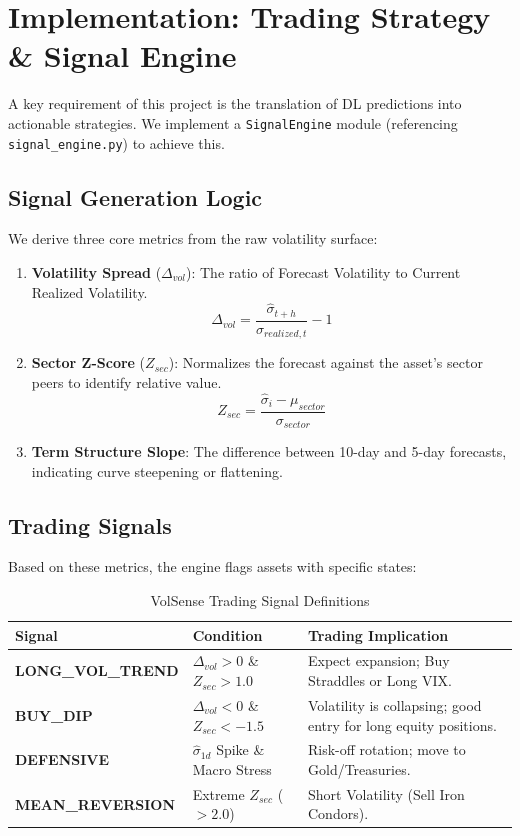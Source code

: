 \documentclass[11pt, a4paper]{article}
\begin{document}
\section{Implementation: Trading Strategy \& Signal Engine}
A key requirement of this project is the translation of DL predictions into actionable strategies. We implement a \texttt{SignalEngine} module (referencing \texttt{signal\_engine.py}) to achieve this.

\subsection{Signal Generation Logic}
We derive three core metrics from the raw volatility surface:
\begin{enumerate}
    \item \textbf{Volatility Spread} ($\Delta_{vol}$): The ratio of Forecast Volatility to Current Realized Volatility.
    \[ \Delta_{vol} = \frac{\hat{\sigma}_{t+h}}{\sigma_{realized, t}} - 1 \]
    \item \textbf{Sector Z-Score} ($Z_{sec}$): Normalizes the forecast against the asset's sector peers to identify relative value.
    \[ Z_{sec} = \frac{\hat{\sigma}_i - \mu_{sector}}{\sigma_{sector}} \]
    \item \textbf{Term Structure Slope}: The difference between 10-day and 5-day forecasts, indicating curve steepening or flattening.
\end{enumerate}

\subsection{Trading Signals}
Based on these metrics, the engine flags assets with specific states:

\begin{table}[H]
\centering
\caption{VolSense Trading Signal Definitions}
\begin{tabular}{llp{7cm}}
\toprule
\textbf{Signal} & \textbf{Condition} & \textbf{Trading Implication} \\
\midrule
\textbf{LONG\_VOL\_TREND} & $\Delta_{vol} > 0$ \& $Z_{sec} > 1.0$ & Expect expansion; Buy Straddles or Long VIX. \\
\textbf{BUY\_DIP} & $\Delta_{vol} < 0$ \& $Z_{sec} < -1.5$ & Volatility is collapsing; good entry for long equity positions. \\
\textbf{DEFENSIVE} & $\hat{\sigma}_{1d}$ Spike \& Macro Stress & Risk-off rotation; move to Gold/Treasuries. \\
\textbf{MEAN\_REVERSION} & Extreme $Z_{sec}$ ($>2.0$) & Short Volatility (Sell Iron Condors). \\
\bottomrule
\end{tabular}
\end{table}
\end{document}
